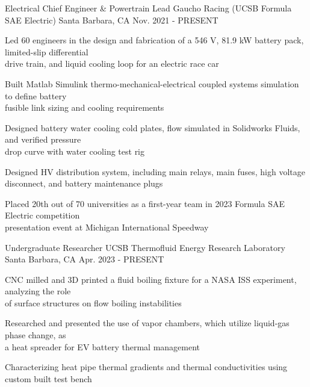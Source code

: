 \begin{cventries}
\cventry
{Electrical Chief Engineer \& Powertrain Lead} %
{Gaucho Racing (UCSB Formula SAE Electric)} %
{Santa Barbara, CA} %
{Nov. 2021 - PRESENT} %
{ %
\begin{cvitems}   
\item {Led 60 engineers in the design and fabrication of a 546 V, 81.9 kW battery pack, limited-slip differential \\ drive train, and liquid cooling loop for an electric race car}
\item {Built Matlab Simulink thermo-mechanical-electrical coupled systems simulation to define battery \\ fusible link sizing and cooling requirements}
\item {Designed battery water cooling cold plates, flow simulated in Solidworks Fluids, and verified pressure \\ drop curve with water cooling test rig}
\item {Designed HV distribution system, including main relays, main fuses, high voltage disconnect, and battery maintenance plugs}
\item {Placed 20th out of 70 universities as a first-year team in 2023 Formula SAE Electric competition\\ presentation event at Michigan International Speedway}
\end{cvitems}
}


\cventry
{Undergraduate Researcher} %
{UCSB Thermofluid Energy Research Laboratory} %
{Santa Barbara, CA} %
{Apr. 2023 - PRESENT} %
{ %
\begin{cvitems}   
\item {CNC milled and 3D printed a fluid boiling fixture for a NASA ISS experiment, analyzing the role \\ of surface structures on flow boiling instabilities}
\item {Researched and presented the use of vapor chambers, which utilize liquid-gas phase change, as \\ a heat spreader for EV battery thermal management}
\item {Characterizing heat pipe thermal gradients and thermal conductivities using custom built test bench}
\end{cvitems}
}




\end{cventries}
